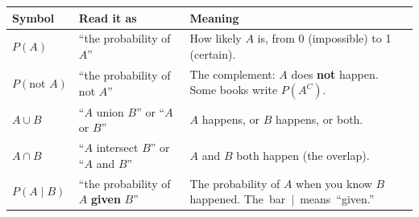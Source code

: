 \documentclass[11pt]{article}
\newcommand{\sumhead}[1]{\par\vspace{0.7em}{\large\bfseries #1}\par\vspace{0.3em}}
\newlength{\sumtw}
\newcommand{\sumtitle}[1]{\settowidth{\sumtw}{\Large\bfseries #1}%
  \ifdim\sumtw>4.3in \hfill Name \underline{\hspace{2in}}\par\vspace{0.5em}{\Large\bfseries #1}\par\vspace{0.6em}%
  \else {\Large\bfseries #1}\hfill Name \underline{\hspace{2in}}\par\vspace{0.6em}\fi}
\begin{document}
\sumtitle{Unit 6 Summary: Probability}

\sumhead{Probability Symbols}
\begin{tabular}{|L{0.72in}|L{1.98in}|L{3.9in}|}\hline
\textbf{Symbol} & \textbf{Read it as} & \textbf{Meaning}\\ \hline
$P(A)$ & ``the probability of $A$'' & How likely $A$ is, from 0 (impossible) to 1 (certain).\\ \hline
$P(\text{not } A)$ & ``the probability of not $A$'' & The complement: $A$ does \textbf{not} happen. Some books write $P(A^C)$.\\ \hline
$A \cup B$ & ``$A$ union $B$'' or ``$A$ or $B$'' & $A$ happens, or $B$ happens, or both.\\ \hline
$A \cap B$ & ``$A$ intersect $B$'' or ``$A$ and $B$'' & $A$ and $B$ both happen (the overlap).\\ \hline
$P(A \mid B)$ & ``the probability of $A$ \textbf{given} $B$'' & The probability of $A$ when you know $B$ happened. \mbox{The bar $\mid$ means ``given.''}\\ \hline
\end{tabular}
\end{document}
